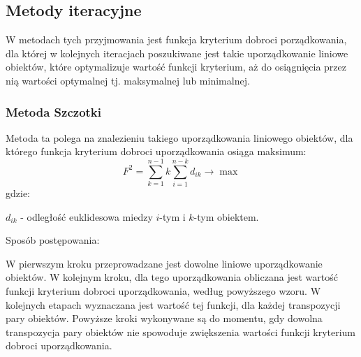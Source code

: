 \documentclass[12pt,a4paper]{report}
\begin{document}
\subsection{Metody iteracyjne}

W metodach tych przyjmowania jest funkcja kryterium dobroci porządkowania, dla której w kolejnych iteracjach poszukiwane jest takie uporządkowanie liniowe obiektów, które optymalizuje wartość funkcji kryterium, aż do osiągnięcia przez nią wartości optymalnej tj. maksymalnej lub minimalnej. 


\subsubsection{Metoda Szczotki}


Metoda ta polega na znalezieniu takiego uporządkowania liniowego obiektów, dla którego funkcja kryterium dobroci uporządkowania osiąga maksimum:
$$
F^{2}=\sum_{k=1}^{n-1} k\sum_{i=1}^{n-k} d_{ik} \rightarrow     \max  
$$
gdzie:

$d_{ik}$ - odległość euklidesowa miedzy $i$-tym i $k$-tym obiektem.


Sposób postępowania:

W pierwszym kroku przeprowadzane jest dowolne liniowe uporządkowanie obiektów. W kolejnym kroku, dla tego uporządkowania obliczana jest wartość funkcji kryterium dobroci uporządkowania, według powyższego wzoru. W kolejnych etapach wyznaczana jest wartość tej funkcji, dla każdej transpozycji pary obiektów. Powyższe kroki wykonywane są do momentu, gdy dowolna transpozycja pary obiektów nie spowoduje zwiększenia wartości funkcji kryterium dobroci uporządkowania. 
\end{document}
